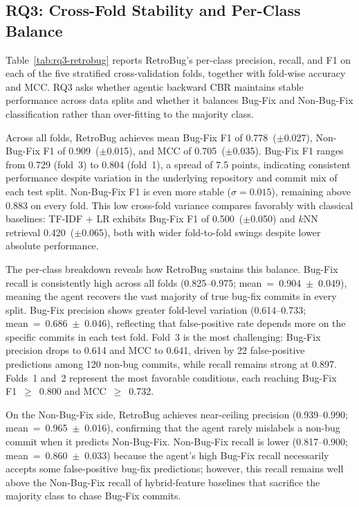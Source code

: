 %         

\subsection{RQ3: Cross-Fold Stability and Per-Class Balance}
\label{sec:results:rq3}

Table~\ref{tab:rq3-retrobug} reports RetroBug's per-class precision,
recall, and F1 on each of the five stratified cross-validation folds,
together with fold-wise accuracy and MCC.
RQ3 asks whether agentic backward CBR maintains stable performance
across data splits and whether it balances Bug-Fix and Non-Bug-Fix
classification rather than over-fitting to the majority class.

Across all folds, RetroBug achieves mean Bug-Fix F1 of
0.778~($\pm$0.027), Non-Bug-Fix F1 of 0.909~($\pm$0.015), and MCC
of 0.705~($\pm$0.035).
Bug-Fix F1 ranges from 0.729 (fold~3) to 0.804 (fold~1), a spread of
7.5 points, indicating consistent performance despite variation in
the underlying repository and commit mix of each test split.
Non-Bug-Fix F1 is even more stable ($\sigma = 0.015$), remaining above
0.883 on every fold.
This low cross-fold variance compares favorably with classical
baselines: TF-IDF + LR exhibits Bug-Fix F1 of 0.500~($\pm$0.050) and
$k$NN retrieval 0.420~($\pm$0.065), both with wider fold-to-fold
swings despite lower absolute performance.

The per-class breakdown reveals how RetroBug sustains this balance.
Bug-Fix recall is consistently high across all folds
(0.825--0.975; mean~=~0.904~$\pm$~0.049), meaning the agent
recovers the vast majority of true bug-fix commits in every split.
Bug-Fix precision shows greater fold-level variation
(0.614--0.733; mean~=~0.686~$\pm$~0.046), reflecting that false-positive
rate depends more on the specific commits in each test fold.
Fold~3 is the most challenging: Bug-Fix precision drops to 0.614 and
MCC to 0.641, driven by 22 false-positive predictions among
120 non-bug commits, while recall remains strong at 0.897.
Folds~1 and~2 represent the most favorable conditions, each reaching
Bug-Fix F1~$\geq$~0.800 and MCC~$\geq$~0.732.

On the Non-Bug-Fix side, RetroBug achieves near-ceiling precision
(0.939--0.990; mean~=~0.965~$\pm$~0.016), confirming that the agent
rarely mislabels a non-bug commit when it predicts Non-Bug-Fix.
Non-Bug-Fix recall is lower (0.817--0.900; mean~=~0.860~$\pm$~0.033)
because the agent's high Bug-Fix recall necessarily accepts some
false-positive bug-fix predictions; however, this recall remains
well above the Non-Bug-Fix recall of hybrid-feature baselines that
sacrifice the majority class to chase Bug-Fix commits.

